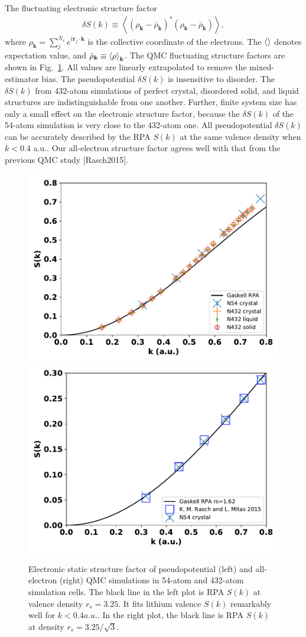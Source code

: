 \documentclass[aps,prl,superscriptaddress]{revtex4-1}
\newcommand{\bs}{\boldsymbol}
\begin{document}
The fluctuating electronic structure factor
\begin{align}
\delta S(k) \equiv \left\langle
(\rho_{\bs{k}}-\bar{\rho}_{\bs{k}})^* (\rho_{\bs{k}}-\bar{\rho}_{\bs{k}})
\right\rangle,
\end{align}
where $\rho_{\bs{k}} = \sum\limits_j^{N_e} e^{i\bs{r}_j\cdot\bs{k}}$ is the collective coordinate of the electrons. The $\braket{}$ denotes expectation value, and $\bar{\rho}_{\bs{k}}\equiv\braket{\rho}_{\bs{k}}$. The QMC fluctuating structure factors are shown in Fig.~\ref{fig:qmc-dsk}. All values are linearly extrapolated to remove the mixed-estimator bias. The pseudopotential $\delta S(k)$ is insensitive to disorder. The $\delta S(k)$ from 432-atom simulations of perfect crystal, disordered solid, and liquid structures are indistinguishable from one another. Further, finite system size has only a small effect on the electronic structure factor, because the $\delta S(k)$ of the 54-atom simulation is very close to the 432-atom one. All pseudopotential $\delta S(k)$ can be accurately described by the RPA $S(k)$ at the same valence density when $k<0.4$ a.u.. Our all-electron structure factor agrees well with that from the previous QMC study [Rasch2015].

\begin{figure}[h]
\includegraphics[width=0.48\linewidth]{figures/li40bg_dsk-bfd}
\includegraphics[width=0.48\linewidth]{figures/li40bg_dsk-fc}
\caption{Electronic static structure factor of pseudopotential (left) and all-electron (right) QMC simulations in 54-atom and 432-atom simulation cells. The black line in the left plot is RPA $S(k)$ at valence density $r_s=3.25$. It fits lithium valence $S(k)$ remarkably well for $k<0.4 a.u.$. In the right plot, the black line is RPA $S(k)$ at density $r_s=3.25/\sqrt{3}$. \label{fig:qmc-dsk}}
\end{figure}
\end{document}
